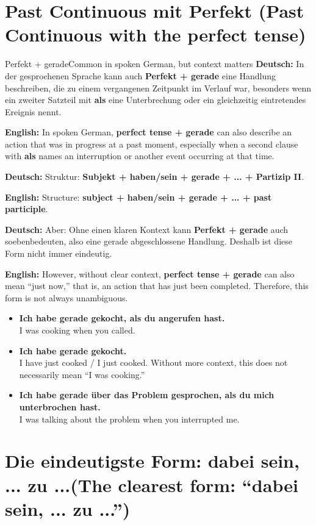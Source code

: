 \documentclass[a4paper,11pt]{article}
\newcommand{\GermanText}[1]{\textbf{Deutsch: }#1\par}
\newcommand{\EnglishText}[1]{{\small\color{SoftGray}\textbf{English: }#1\par}}
\newcommand{\ExampleItem}[2]{\item \textbf{#1}\\{\small\color{SoftGray}#2}}
\begin{document}
    \section{Past Continuous mit Perfekt \textnormal{(Past Continuous with the perfect tense)}}

        \begin{grammarentry}{Perfekt + gerade}{Common in spoken German, but context matters}
            \GermanText{In der gesprochenen Sprache kann auch \textbf{Perfekt + gerade} eine Handlung beschreiben, die zu einem vergangenen Zeitpunkt im Verlauf war, besonders wenn ein zweiter Satzteil mit \textbf{als} eine Unterbrechung oder ein gleichzeitig eintretendes Ereignis nennt.}
            \EnglishText{In spoken German, \textbf{perfect tense + gerade} can also describe an action that was in progress at a past moment, especially when a second clause with \textbf{als} names an interruption or another event occurring at that time.}

            \GermanText{Struktur: \textbf{Subjekt + haben/sein + gerade + ... + Partizip II}.}
            \EnglishText{Structure: \textbf{subject + haben/sein + gerade + ... + past participle}.}

            \GermanText{Aber: Ohne einen klaren Kontext kann \textbf{Perfekt + gerade} auch \glqq soeben\grqq bedeuten, also eine gerade abgeschlossene Handlung. Deshalb ist diese Form nicht immer eindeutig.}
            \EnglishText{However, without clear context, \textbf{perfect tense + gerade} can also mean ``just now,'' that is, an action that has just been completed. Therefore, this form is not always unambiguous.}
        \end{grammarentry}

        \begin{exbox}
            \begin{itemize}
                \ExampleItem{Ich habe gerade gekocht, als du angerufen hast.}{I was cooking when you called.}
                \ExampleItem{Ich habe gerade gekocht.}{I have just cooked / I just cooked. Without more context, this does not necessarily mean ``I was cooking.''}
                \ExampleItem{Ich habe gerade über das Problem gesprochen, als du mich unterbrochen hast.}{I was talking about the problem when you interrupted me.}
            \end{itemize}
        \end{exbox}

    \section{Die eindeutigste Form: \glqq dabei sein, ... zu ...\grqq \textnormal{(The clearest form: ``dabei sein, ... zu ...'')}}
\end{document}
